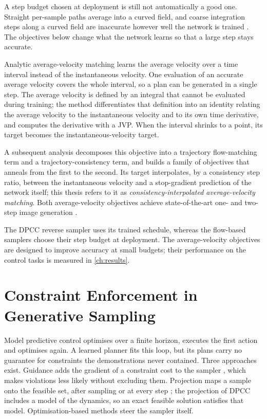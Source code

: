 A step budget chosen at deployment is still not automatically a good one. Straight per-sample paths
average into a curved field, and coarse integration steps along a curved field are inaccurate however
well the network is trained \parencite[Sec.~3]{geng2025meanflow}. The objectives below change what the
network learns so that a large step stays accurate.

Analytic average-velocity matching \parencite{geng2025meanflow} learns the average velocity over a
time interval instead of the instantaneous velocity. One evaluation of an accurate average velocity covers the whole interval, so a
plan can be generated in a single step. The average velocity is defined by an integral that cannot be
evaluated during training; the method differentiates that definition into an identity relating the
average velocity to the instantaneous velocity and to its own time derivative, and computes the
derivative with a \ac{JVP}. When the interval shrinks to a point, its target becomes the
instantaneous-velocity target.

A subsequent analysis \parencite{zhang2025alphaflow} decomposes this objective into a
trajectory flow-matching term and a trajectory-consistency term, and builds a family of objectives
that anneals from the first to the second. Its target interpolates, by a consistency step ratio,
between the instantaneous velocity and a stop-gradient prediction of the network itself; this thesis
refers to it as \emph{consistency-interpolated average-velocity matching}. Both average-velocity
objectives achieve state-of-the-art one- and two-step image generation
\parencite{geng2025meanflow,zhang2025alphaflow}.

The DPCC reverse sampler uses its trained schedule, whereas the flow-based samplers choose their
step budget at deployment. The average-velocity objectives are designed to improve accuracy at
small budgets; their performance on the control tasks is measured in \autoref{ch:results}.

\section{Constraint Enforcement in Generative Sampling}\label{sec:bg:mpc}

Model predictive control \parencite{morari1999model} optimises over a finite horizon, executes the
first action and optimises again. A learned planner fits this loop, but its plans carry no guarantee
for constraints the demonstrations never contained. Three approaches exist. Guidance adds the gradient
of a constraint cost to the sampler \parencite{carvalho2025motion}, which makes violations less likely
without excluding them. Projection maps a sample onto the feasible set, after sampling
\parencite{power2023sampling} or at every step \parencite{christopher2024constrained,romer2025diffusion};
the projection of \ac{DPCC} includes a model of the dynamics, so an exact feasible solution satisfies
that model. Optimisation-based methods steer the sampler itself.

